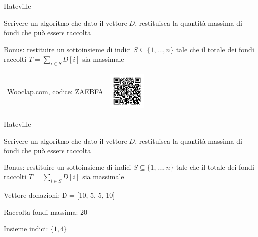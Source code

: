 \begin{frame}{Hateville}

\vspace{-9pt}
\begin{myboxtitle}[Problemi]
\BIL
\item Scrivere un algoritmo che dato il vettore $D$, restituisca la quantità massima di
fondi che può essere raccolta
\item Bonus: restituire un sottoinsieme di indici 
$S \subseteq \{ 1, \ldots, n \}$ tale che il totale dei fondi raccolti
$T = \sum_{i \in S} D[i]$ sia massimale
\EIL
\end{myboxtitle}

\begin{myboxtitle}[Qual è la donazione massima con \alert{$D = [4, 3, 6, 5, 8, 7]$?}]
\vspace{-6pt}
\begin{tabular}{m{7cm}m{3cm}}
Wooclap.com, codice: \href{https://app.wooclap.com/ZAEBFA}{\alert{\underline{ZAEBFA}}}
&
\includegraphics[width=1.8cm]{qrcode-13-pd1.png}\\
\end{tabular}
\vspace{-6pt}
\end{myboxtitle}


\end{frame}

\begin{frame}{Hateville}

\vspace{-9pt}
\begin{myboxtitle}[Problemi]
\BIL
\item Scrivere un algoritmo che dato il vettore $D$, restituisca la quantità massima di
fondi che può essere raccolta
\item Bonus: restituire un sottoinsieme di indici 
$S \subseteq \{ 1, \ldots, n \}$ tale che il totale dei fondi raccolti
$T = \sum_{i \in S} D[i]$ sia massimale
\EIL
\end{myboxtitle}

\begin{myboxtitle}
\BIL
\item Vettore donazioni: \textsf{D = [10, 5, 5, 10]}
\pause
\item Raccolta fondi massima: 20
\item Insieme indici: $\{1, 4\}$
\EIL
\end{myboxtitle}
\end{frame}


